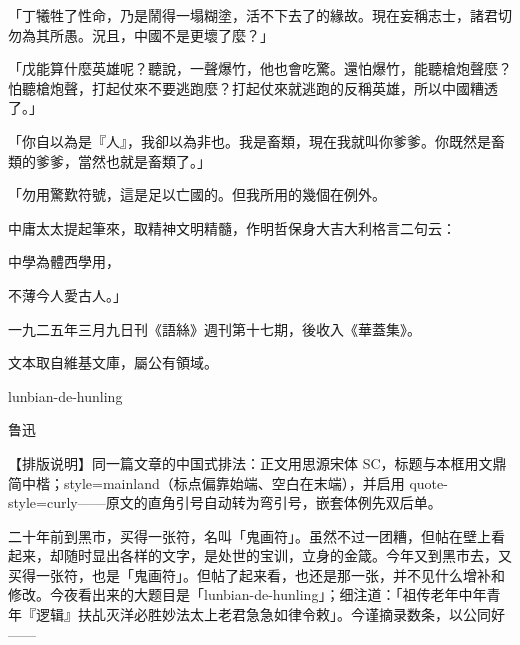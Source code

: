 \documentclass[12pt]{article}
\newcommand\en[1]{{\garamond #1}}
\begin{document}
「丁犧牲了性命，乃是鬧得一塌糊塗，活不下去了的緣故。現在妄稱志士，諸君切勿為其所愚。況且，中國不是更壞了麼？」

「戊能算什麼英雄呢？聽說，一聲爆竹，他也會吃驚。還怕爆竹，能聽槍炮聲麼？怕聽槍炮聲，打起仗來不要逃跑麼？打起仗來就逃跑的反稱英雄，所以中國糟透了。」

「你自以為是『人』，我卻以為非也。我是畜類，現在我就叫你爹爹。你既然是畜類的爹爹，當然也就是畜類了。」

「勿用驚歎符號，這是足以亡國的。但我所用的幾個在例外。

中庸太太提起筆來，取精神文明精髓，作明哲保身大吉大利格言二句云：

中學為體西學用，

不薄今人愛古人。」

\vspace{0.6em}
{\small 一九二五年三月九日刊《語絲》週刊第十七期，後收入《華蓋集》。

文本取自維基文庫，屬公有領域。}


\clearpage
\scserif
{}

{\centering\kaitisc{} lunbian-de-hunling\par}
\vspace{0.3em}
{\centering\kaitisc{} 鲁迅\par}
\vspace{1.2em}

\noindent\setlength{\fboxsep}{0.8em}%
\colorbox{blue!7!cyan!5}{\parbox{\dimexpr\linewidth-2\fboxsep\relax}{%
  \kaitisc\small\setlength{\parindent}{0pt}\color{black!75}%
  【排版说明】同一篇文章的中国式排法：正文用思源宋体 \en{SC}，标题与本框用文鼎简中楷；\en{style=mainland}（标点偏靠始端、空白在末端），并启用 \en{quote-style=curly}——原文的直角引号自动转为弯引号，嵌套体例先双后单。}}
\vspace{0.8em}

二十年前到黑市，买得一张符，名叫「鬼画符」。虽然不过一团糟，但帖在壁上看起来，却随时显出各样的文字，是处世的宝训，立身的金箴。今年又到黑市去，又买得一张符，也是「鬼画符」。但帖了起来看，也还是那一张，并不见什么增补和修改。今夜看出来的大题目是「lunbian-de-hunling」；细注道：「祖传老年中年青年『逻辑』扶乩灭洋必胜妙法太上老君急急如律令敕」。今谨摘录数条，以公同好——
\end{document}
